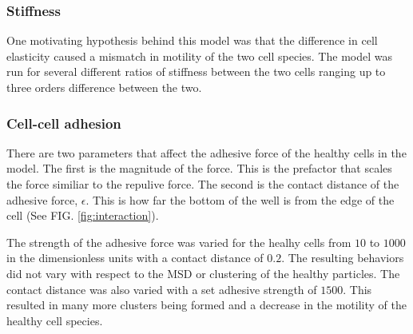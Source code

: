 \documentclass[aps,prb,twocolumn,groupedaddress,nofootinbib,floatfix]{revtex4}
\begin{document}
\subsubsection{Stiffness}

One motivating hypothesis behind this model was that the difference in cell elasticity caused a mismatch in motility of the two cell species.
The model was run for several different ratios of stiffness between the two cells ranging up to three orders difference between the two.

\subsubsection{Cell-cell adhesion}

There are two parameters that affect the adhesive force of the healthy cells in the model.
The first is the magnitude of the force.
This is the prefactor that scales the force similiar to the repulive force.
The second is the contact distance of the adhesive force, $\epsilon$.
This is how far the bottom of the well is from the edge of the cell (See FIG. \ref{fig:interaction}).

The strength of the adhesive force was varied for the healhy cells from $10$ to $1000$ in the dimensionless units with a contact distance of $0.2$.
The resulting behaviors did not vary with respect to the MSD or clustering of the healthy particles.
The contact distance was also varied with a set adhesive strength of $1500$.
This resulted in many more clusters being formed and a decrease in the motility of the healthy cell species.
\end{document}
